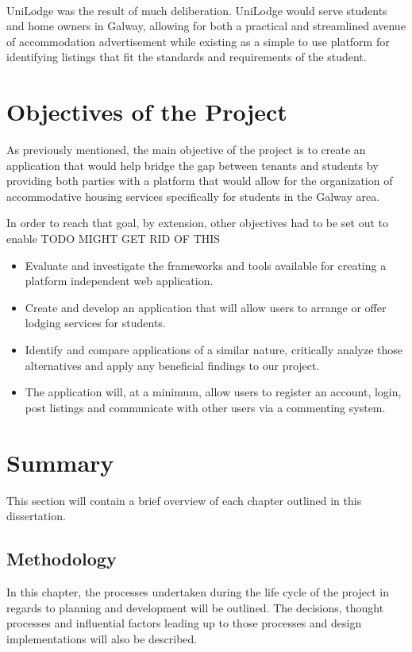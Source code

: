 \paragraph{}
UniLodge was the result of much deliberation. UniLodge would serve students and home owners in Galway, allowing for both a practical and streamlined avenue of accommodation advertisement while existing as a simple to use platform for identifying listings that fit the standards and requirements of the student. 

\section{Objectives of the Project}
As previously mentioned, the main objective of the project is to create an application that would help bridge the gap between tenants and students by providing both parties with a platform that would allow for the organization of accommodative housing services specifically for students in the Galway area.

In order to reach that goal, by extension, other objectives had to be set out to enable TODO
MIGHT GET RID OF THIS
\begin{itemize}
    \item Evaluate and investigate the frameworks and tools available for creating a platform independent web application.
    \item Create and develop an application that will allow users to arrange or offer lodging services for students.
    \item Identify and compare applications of a similar nature, critically analyze those alternatives and apply any beneficial findings to our project.
    \item The application will, at a minimum, allow users to register an account, login, post listings and communicate with other users via a commenting system.
\end{itemize}


\section{Summary}
This section will contain a brief overview of each chapter outlined in this dissertation.
\subsection{Methodology}
In this chapter, the processes undertaken during the life cycle of the project in regards to planning and development will be outlined. The decisions, thought processes and influential factors leading up to those processes and design implementations will also be described.

